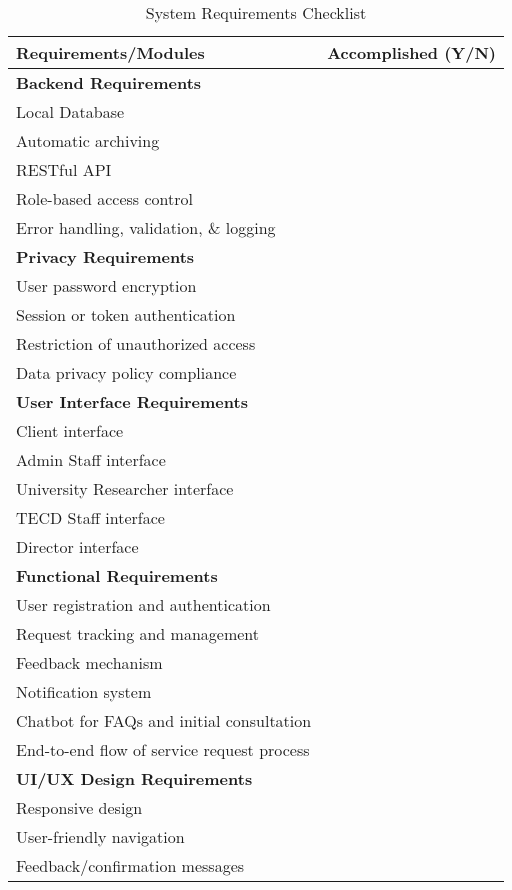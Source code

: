 \begin{table}[ht]
	\centering
	\begin{tabular}{|p{10cm}|c|}
		\hline
		\textbf{Requirements/Modules} & \textbf{Accomplished (Y/N)} \\
			\hline
			\multicolumn{2}{|l|}{\textbf{Backend Requirements}} \\
				\hline
				Local Database & \\
				Automatic archiving & \\
				RESTful API & \\
				Role-based access control & \\
				Error handling, validation, \& logging & \\
				\hline
			\multicolumn{2}{|l|}{\textbf{Privacy Requirements}} \\
				\hline
				User password encryption & \\
				Session or token authentication & \\
				Restriction of unauthorized access & \\
				Data privacy policy compliance & \\
				\hline
			\multicolumn{2}{|l|}{\textbf{User Interface Requirements}} \\
				\hline
				Client interface & \\
				Admin Staff interface & \\
				University Researcher interface & \\
				TECD Staff interface & \\
				Director interface & \\
				\hline
			\multicolumn{2}{|l|}{\textbf{Functional Requirements}} \\
				\hline
				User registration and authentication & \\
				Request tracking and management & \\
				Feedback mechanism & \\
				Notification system & \\
				Chatbot for FAQs and initial consultation & \\
				End-to-end flow of service request process & \\
				\hline
			\multicolumn{2}{|l|}{\textbf{UI/UX Design Requirements}} \\
				\hline
				Responsive design & \\
				User-friendly navigation & \\
				Feedback/confirmation messages & \\
				\hline
	\end{tabular}
	\caption{System Requirements Checklist}
	\label{tab:requirements}
\end{table}

